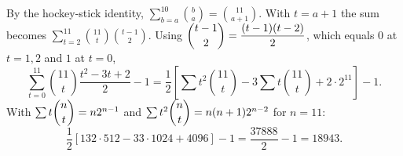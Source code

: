 By the hockey-stick identity, $\displaystyle\sum_{b=a}^{10}\binom ba=\binom{11}{a+1}$. With $t=a+1$ the sum becomes $\displaystyle\sum_{t=2}^{11}\binom{11}t\binom{t-1}2$. Using $\dbinom{t-1}2=\dfrac{(t-1)(t-2)}2$, which equals $0$ at $t=1,2$ and $1$ at $t=0$,
\[\sum_{t=0}^{11}\binom{11}t\dfrac{t^2-3t+2}2-1=\dfrac12\left[\sum t^2\binom{11}t-3\sum t\binom{11}t+2\cdot2^{11}\right]-1.\]
With $\sum t\dbinom nt=n2^{n-1}$ and $\sum t^2\dbinom nt=n(n+1)2^{n-2}$ for $n=11$:
\[\dfrac12\left[132\cdot512-33\cdot1024+4096\right]-1=\dfrac{37888}2-1=\boxed{18943}.\]
